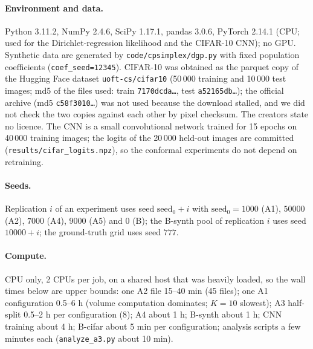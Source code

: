 \paragraph{Environment and data.}
Python 3.11.2, NumPy 2.4.6, SciPy 1.17.1, pandas 3.0.6, PyTorch 2.14.1 (CPU; used for the Dirichlet-regression likelihood and the CIFAR-10 CNN); no GPU. Synthetic data are generated by \texttt{code/cpsimplex/dgp.py} with fixed population coefficients (\texttt{coef\_seed=12345}). CIFAR-10 \citep{krizhevsky2009learning} was obtained as the parquet copy of the Hugging Face dataset \texttt{uoft-cs/cifar10} (50\,000 training and 10\,000 test images; md5 of the files used: train \texttt{7170dcda\ldots}, test \texttt{a52165db\ldots}); the official archive (md5 \texttt{c58f3010\ldots}) was not used because the download stalled, and we did not check the two copies against each other by pixel checksum. The creators state no licence. The CNN is a small convolutional network trained for 15 epochs on 40\,000 training images; the logits of the 20\,000 held-out images are committed (\texttt{results/cifar\_logits.npz}), so the conformal experiments do not depend on retraining.

\paragraph{Seeds.}
Replication $i$ of an experiment uses seed $\text{seed}_0+i$ with $\text{seed}_0=1000$ (A1), $50000$ (A2), $7000$ (A4), $9000$ (A5) and $0$ (B); the B-synth pool of replication $i$ uses seed $10000+i$; the ground-truth grid uses seed $777$.

\paragraph{Compute.}
CPU only, 2 CPUs per job, on a shared host that was heavily loaded, so the wall times below are upper bounds: one A2 file 15--40 min (45 files); one A1 configuration 0.5--6 h (volume computation dominates; $K=10$ slowest); A3 half-split 0.5--2 h per configuration (8); A4 about 1 h; B-synth about 1 h; CNN training about 4 h; B-cifar about 5 min per configuration; analysis scripts a few minutes each (\texttt{analyze\_a3.py} about 10 min).

